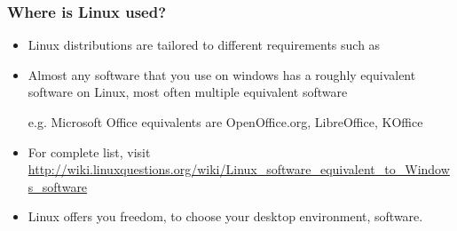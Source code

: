 \documentclass[10pt,t]{beamer}
\begin{document}
\begin{frame}
  \frametitle{Where is Linux used?}
  \begin{itemize}
    \item Linux distributions are tailored to different requirements such as
    \item Almost any software that you use on windows has a roughly equivalent software on Linux, most often multiple equivalent software
    \item[e.g.] Microsoft Office equivalents are OpenOffice.org, LibreOffice, KOffice
    \item For complete list, visit \url{http://wiki.linuxquestions.org/wiki/Linux_software_equivalent_to_Windows_software}
    \item Linux offers you freedom, to choose your desktop environment, software.
  \end{itemize}
\end{frame}
\end{document}
